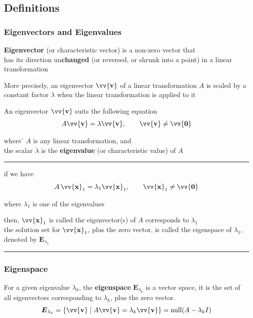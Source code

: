 \documentclass[11pt]{article}
\DeclareRobustCommand{\myvec}[1]{\vv{\mathbf{#1}}}
\newcommand{\mysubvecsp}[1]{\bm{{#1}}}
\newcommand{\mymat}[1]{#1}
\begin{document}
    \subsection{Definitions}
    \subsubsection{Eigenvectors and Eigenvalues}
    \textbf{Eigenvector} (or characteristic vector) is a non-zero vector that \\
    has its direction un\large \textbf{changed} (or reversed, or shrunk into a point) in a linear transformation
    \vspace{\belowdisplayshortskip}

    More precisely, an eigenvector $\myvec{v}$ of a linear transformation $\mymat{A}$ is scaled by a constant factor $\lambda$ when the linear transformation is applied to it
    \vspace{\belowdisplayshortskip}

    \noindent
    \begin{minipage}{\linewidth}
        An eigenvector $\myvec{v}$ suits the following equation
        \begin{equation}
            \mymat{A}\myvec{v} = \lambda\myvec{v}, \qquad \myvec{v} \ne \myvec{0}
        \end{equation} 
        \begin{tabbing}
            where \= $\mymat{A}$ is any linear transformation, and\\
            \> the scalar $\lambda$ is the \textbf{eigenvalue} (or characteristic value) of $\mymat{A}$ 
        \end{tabbing}
    \end{minipage}
    \hbox{}

    \noindent \rule{\textwidth}{0.1pt} 
    if we have
    \[ \mymat{A}\,\myvec{x}_1 = \lambda_1 \myvec{x}_1, \qquad \myvec{x}_1 \ne \myvec{0} \]
    \begin{center}
        where $\lambda_1$ is one of the eigenvalues
    \end{center}
    then, $\myvec{x}_1$ is called the eigenvector(s) of $\mymat{A}$ corresponds to $\lambda_1$\\
    the solution set for $\myvec{x}_1$, plus the zero vector, is called the eigenspace of $\lambda_1$, denoted by $\mysubvecsp{E}_{\lambda_1}$
    \noindent \rule{\textwidth}{0.1pt} 

    \subsubsection{Eigenspace}
    For a given eigenvalue $\lambda_k$, the \textbf{eigenspace} $\mysubvecsp{E}_{\lambda_k}$ is a vector space, it is the set of all eigenvectors corresponding to $\lambda_k$, plus the zero vector.
    \begin{equation}
        \mysubvecsp{E}_{\lambda_k} = \{ \myvec{v} \mid \mymat{A}\myvec{v} = \lambda_k\myvec{v} \} = \operatorname{null}(\mymat{A}-\lambda_k \mymat{I})
    \end{equation}
\end{document}
